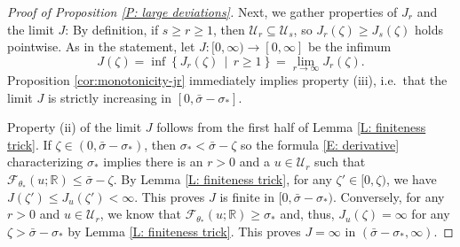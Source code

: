 \documentclass[12pt]{amsart}
\begin{document}
\begin{proof}[Proof of Proposition \ref{P: large deviations}]
		
        
        Next, we gather properties of $ J_r $ and the limit $ J $: By definition, if $s \geq r \geq 1$, then $\mathcal{U}_{r} \subseteq \mathcal{U}_{s}$, so $J_{r}(\zeta) \geq J_{s}(\zeta)$ holds pointwise.  As in the statement, let $J : [0,\infty) \to [0,\infty]$ be the infimum
        \begin{equation}\label{eqn:defn-j-alternative}
            J(\zeta) = \inf \left\{ J_{r}(\zeta) \, \mid \, r \geq 1 \right\} = \lim_{ r \to \infty } J_{r}(\zeta).
        \end{equation}
       	Proposition \ref{cor:monotonicity-jr} immediately implies property (iii), i.e.~that the limit $ J $ is strictly increasing in $[0,\bar{\sigma}-\sigma_{*}]$.
	
        Property (ii) of the limit $ J $ follows from the first half of Lemma \ref{L: finiteness trick}. If $\zeta \in (0,\bar{\sigma} - \sigma_{*})$, then $\sigma_{*} <\bar{\sigma} - \zeta$ so the formula \eqref{E: derivative} characterizing $\sigma_{*}$ implies there is an $r > 0$ and a $u \in \mathcal{U}_{r}$ such that $\mathscr{F}_{\theta_{*}}(u;\mathbb{R}) \leq \bar{\sigma} - \zeta$.  By Lemma \ref{L: finiteness trick}, for any $\zeta' \in [0,\zeta)$, we have $J(\zeta') \leq J_{u}(\zeta') < \infty$.  This proves $J$ is finite in $[0,\bar{\sigma} - \sigma_{*})$.  
        Conversely, for any $r > 0$ and $u \in \mathcal{U}_{r}$, we know that $\mathscr{F}_{\theta_{*}}(u;\mathbb{R}) \geq \sigma_{*}$ and, thus, $J_{u}(\zeta) = \infty$ for any $\zeta > \bar{\sigma} - \sigma_{*}$ by Lemma \ref{L: finiteness trick}.  This proves $J = \infty$ in $(\bar{\sigma}-\sigma_{*},\infty)$.     
        

\end{proof}
\end{document}
